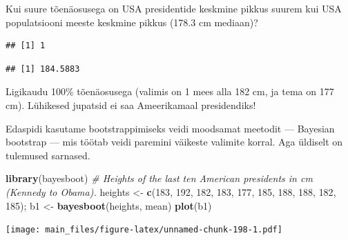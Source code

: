 \documentclass[]{book}
\newenvironment{Shaded}{\begin{snugshade}}{\end{snugshade}}
\newcommand{\KeywordTok}[1]{\textcolor[rgb]{0.13,0.29,0.53}{\textbf{#1}}}
\newcommand{\DecValTok}[1]{\textcolor[rgb]{0.00,0.00,0.81}{#1}}
\newcommand{\FloatTok}[1]{\textcolor[rgb]{0.00,0.00,0.81}{#1}}
\newcommand{\StringTok}[1]{\textcolor[rgb]{0.31,0.60,0.02}{#1}}
\newcommand{\CommentTok}[1]{\textcolor[rgb]{0.56,0.35,0.01}{\textit{#1}}}
\newcommand{\OperatorTok}[1]{\textcolor[rgb]{0.81,0.36,0.00}{\textbf{#1}}}
\newcommand{\NormalTok}[1]{#1}
\begin{document}
Kui suure tõenäosusega on USA presidentide keskmine pikkus suurem kui
USA populatsiooni meeste keskmine pikkus (178.3 cm mediaan)?

\begin{Shaded}
\end{Shaded}

\begin{verbatim}
## [1] 1
\end{verbatim}

\begin{Shaded}
\end{Shaded}

\begin{verbatim}
## [1] 184.5883
\end{verbatim}

Ligikaudu 100\% tõenäosusega (valimis on 1 mees alla 182 cm, ja tema on
177 cm). Lühikesed jupatsid ei saa Ameerikamaal presidendiks!

Edaspidi kasutame bootstrappimiseks veidi moodsamat meetodit ---
Bayesian bootstrap --- mis töötab veidi paremini väikeste valimite
korral. Aga üldiselt on tulemused sarnased.

\begin{Shaded}
\begin{Highlighting}[]
\KeywordTok{library}\NormalTok{(bayesboot)}
\CommentTok{# Heights of the last ten American presidents in cm (Kennedy to Obama).}
\NormalTok{heights <-}\StringTok{ }\KeywordTok{c}\NormalTok{(}\DecValTok{183}\NormalTok{, }\DecValTok{192}\NormalTok{, }\DecValTok{182}\NormalTok{, }\DecValTok{183}\NormalTok{, }\DecValTok{177}\NormalTok{, }\DecValTok{185}\NormalTok{, }\DecValTok{188}\NormalTok{, }\DecValTok{188}\NormalTok{, }\DecValTok{182}\NormalTok{, }\DecValTok{185}\NormalTok{);}
\NormalTok{b1 <-}\StringTok{ }\KeywordTok{bayesboot}\NormalTok{(heights, mean)}
\KeywordTok{plot}\NormalTok{(b1)}
\end{Highlighting}
\end{Shaded}

\texttt{[image: main\_files/figure-latex/unnamed-chunk-198-1.pdf]}
\end{document}
